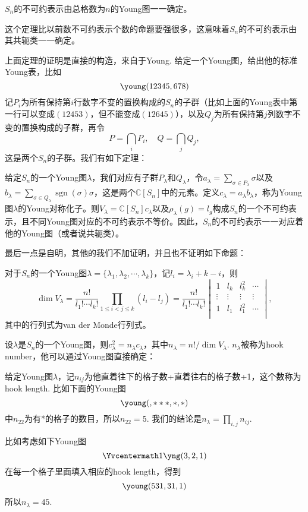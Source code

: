 \documentclass[11pt]{article}
\theoremstyle{definition}
\theoremstyle{plain}
\newcommand{\cc}{\mathbb{C}}
\DeclareMathOperator{\sgn}{sgn}
\begin{document}
{\thm $S_n$的不可约表示由总格数为$n$的Young图一一确定。\endthm}

这个定理比以前数不可约表示个数的命题要强很多，这意味着$S_n$的不可约表示由其共轭类一一确定。

\para 上面定理的证明是直接的构造，来自于Young. 给定一个Young图，给出他的标准Young表，比如
\[
	\young(12345,678)
\]
记$P_i$为所有保持第$i$行数字不变的置换构成的$S_n$的子群（比如上面的Young表中第一行可以变成$(12453)$，但不能变成$(12645)$），以及$Q_j$为所有保持第$j$列数字不变的置换构成的子群，再令
\[
	P=\bigcap_i P_i,\quad Q=\bigcap_j Q_j,
\]
这是两个$S_n$的子群。我们有如下定理：

{\thm 给定$S_n$的一个Young图$\lambda$，我们对应有子群$P_\lambda$和$Q_\lambda$，令$a_\lambda=\sum_{\sigma\in P_\lambda}\sigma$以及$b_\lambda=\sum_{\sigma\in Q_\lambda}\sgn(\sigma)\sigma$，这是两个$\cc[S_n]$中的元素。定义$c_\lambda=a_\lambda b_\lambda$，称为Young图$\lambda$的Young对称化子。则$V_\lambda=\cc[S_n]c_\lambda$以及$\rho_\lambda(g)=l_g$构成$S_n$的一个不可约表示，且不同Young图对应的不可约表示不等价。因此，$S_n$的不可约表示一一对应着他的Young图（或者说共轭类）。\endthm}

最后一点是自明，其他的我们不加证明，并且也不证明如下命题：

{\pro 对于$S_n$的一个Young图$\lambda=\{\lambda_1,\lambda_2,\cdots,\lambda_k\}$，记$l_i=\lambda_i+k-i$，则
\[
	\dim V_\lambda=\frac{n!}{l_1!\cdots l_k!}\prod_{1\leq i< j\leq k}(l_i-l_j)=\frac{n!}{l_1!\cdots l_k!}\begin{vmatrix}
	1& l_k & l_k^2&\cdots\\
	\vdots&\vdots&\vdots&\vdots\\
	1& l_1 & l_1^2&\cdots\\
	\end{vmatrix},
\]
其中的行列式为van der Monde行列式。\endpro}

{\pro 设$\lambda$是$S_n$的一个Young图，则$c_\lambda^2=n_\lambda c_\lambda$，其中$n_\lambda=n!/\dim V_\lambda$. $n_\lambda$被称为hook number，他可以通过Young图直接确定：\endpro}

给定Young图$\lambda$，记$n_{ij}$为他直着往下的格子数+直着往右的格子数+1，这个数称为hook length. 比如下面的Young图
\[
	\young(\hfil \hfil \hfil \hfil ,\hfil ***,\hfil *\hfil ,\hfil *)
\]
中$n_{22}$为有*的格子的数目，所以$n_{22}=5$. 我们的结论是$n_\lambda=\prod_{i,j}n_{ij}$.

比如考虑如下Young图\[\Yvcentermath1
	\yng(3,2,1)
\]
在每一个格子里面填入相应的hook length，得到
\[
	\young(531,31,1)
\]
所以$n_\lambda= 45$.
\end{document}
